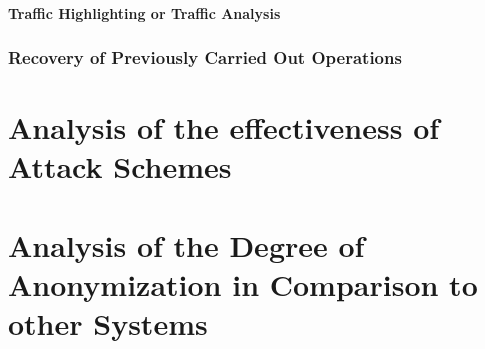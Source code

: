 \subsubsection{Traffic Highlighting or Traffic Analysis}
\subsection{Recovery of Previously Carried Out Operations}

\chapter{Analysis of the effectiveness of Attack Schemes}
\chapter{Analysis of the Degree of Anonymization in Comparison to other Systems}

